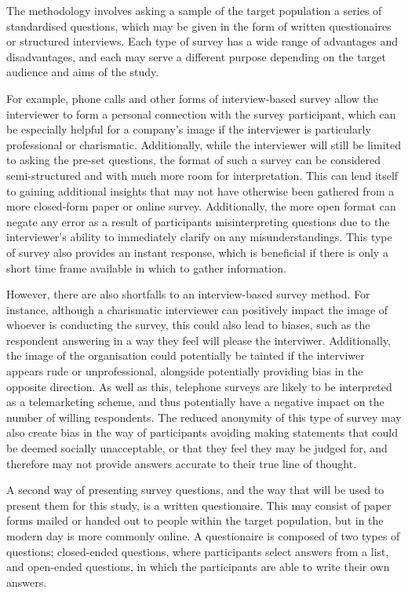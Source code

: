 The methodology involves asking a sample of the target population a series of standardised questions, which may be given in 
the form of written questionaires or structured interviews. Each type of survey has a wide range of advantages and disadvantages, 
and each may serve a different purpose depending on the target audience and aims of the study. 

For example, phone calls and other forms of interview-based survey allow the interviewer to form a personal connection with 
the survey participant, which can be especially helpful for a company's image if the interviewer is particularly professional 
or charismatic. Additionally, while the interviewer will still be limited to asking the pre-set questions, the format of such a survey can 
be considered semi-structured and with much more room for interpretation. This can lend itself to gaining additional insights
that may not have otherwise been gathered from a more closed-form paper or online survey. Additionally, the more open format
can negate any error as a result of participants misinterpreting questions due to the interviewer's ability to immediately 
clarify on any misunderstandings. This type of survey also provides an instant response, which is beneficial if there is only 
a short time frame available in which to gather information. 

However, there are also shortfalls to an interview-based survey method. For instance, although a charismatic interviewer can 
positively impact the image of whoever is conducting the survey, this could also lead to biases, such as the respondent 
answering in a way they feel will please the interviwer.
Additionally, the image of the organisation could potentially be tainted if the interviwer appears rude or unprofessional, 
alongside potentially providing bias in the opposite direction. As well as this, telephone surveys are likely to be 
interpreted as a telemarketing scheme, and thus potentially have a negative impact on the number of willing respondents.
The reduced anonymity of this type of survey may also create bias in the way of participants avoiding making statements
that could be deemed socially unacceptable, or that they feel they may be judged for, and therefore may not provide answers
accurate to their true line of thought.

A second way of presenting survey questions, and the way that will be used to present them for this study, is a written questionaire.
This may consist of paper forms mailed or handed out to people within the target population, but in the modern day is more 
commonly online. A questionaire is composed of two types of questions; closed-ended questions, where participants select answers 
from a list, and open-ended questions, in which the participants are able to write their own answers. 



